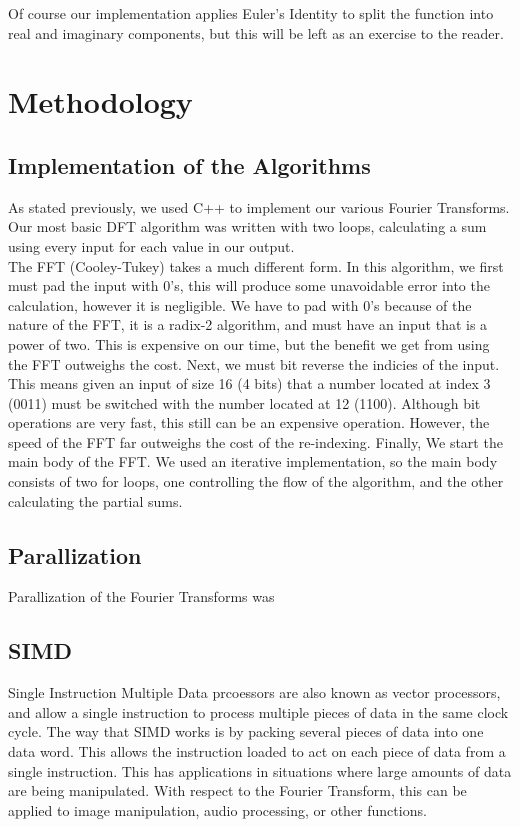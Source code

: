 \documentclass[12pt]{extarticle}
\begin{document}
    Of course our implementation applies Euler's Identity to split the function into real and imaginary components, but this will be left as an exercise to the reader.

\section*{Methodology}

	\subsection*{Implementation of the Algorithms}
		As stated previously, we used C++ to implement our various Fourier Transforms.
		Our most basic DFT algorithm was written with two loops, calculating a sum using every input for each value in our output.
		\\

		The FFT (Cooley-Tukey) takes a much different form.
		In this algorithm, we first must pad the input with 0's, this will produce some unavoidable error into the calculation, however it is negligible.
		We have to pad with 0's because of the nature of the FFT, it is a radix-2 algorithm, and must have an input that is a power of two.
		This is expensive on our time, but the benefit we get from using the FFT outweighs the cost.
		Next, we must bit reverse the indicies of the input.
		This means given an input of size 16 (4 bits) that a number located at index 3 (0011) must be switched with the number located at 12 (1100).
		Although bit operations are very fast, this still can be an expensive operation. 
		However, the speed of the FFT far outweighs the cost of the re-indexing.
		Finally, We start the main body of the FFT.
		We used an iterative implementation, so the main body consists of two for loops, one controlling the flow of the algorithm, and the other calculating the partial sums.
		
		

\subsection*{Parallization} 
    Parallization of the Fourier Transforms was 


\subsection*{SIMD}
    
    Single Instruction Multiple Data prcoessors are also known as vector processors, and allow a single instruction
    to process multiple pieces of data in the same clock cycle. The way that SIMD works is by packing several pieces of data
    into one data word. This allows the instruction loaded to act on each piece of data from a single instruction.
    This has applications in situations where large amounts of data are being manipulated. With respect to the Fourier Transform,
    this can be applied to image manipulation, audio processing, or other functions.
\end{document}

